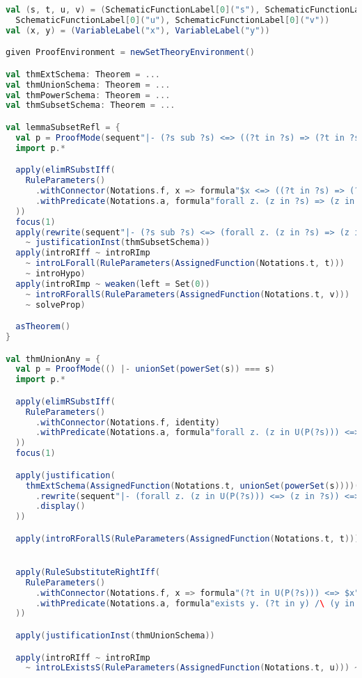 \begin{lstlisting}[language=Scala,basicstyle=\fontsize{2.5}{4}\selectfont]
val (s, t, u, v) = (SchematicFunctionLabel[0]("s"), SchematicFunctionLabel[0]("t"),
  SchematicFunctionLabel[0]("u"), SchematicFunctionLabel[0]("v"))
val (x, y) = (VariableLabel("x"), VariableLabel("y"))

given ProofEnvironment = newSetTheoryEnvironment()

val thmExtSchema: Theorem = ...
val thmUnionSchema: Theorem = ...
val thmPowerSchema: Theorem = ...
val thmSubsetSchema: Theorem = ...

val lemmaSubsetRefl = {
  val p = ProofMode(sequent"|- (?s sub ?s) <=> ((?t in ?s) => (?t in ?s))")
  import p.*

  apply(elimRSubstIff(
    RuleParameters()
      .withConnector(Notations.f, x => formula"$x <=> ((?t in ?s) => (?t in ?s))")
      .withPredicate(Notations.a, formula"forall z. (z in ?s) => (z in ?s)")
  ))
  focus(1)
  apply(rewrite(sequent"|- (?s sub ?s) <=> (forall z. (z in ?s) => (z in ?s))")
    ~ justificationInst(thmSubsetSchema))
  apply(introRIff ~ introRImp
    ~ introLForall(RuleParameters(AssignedFunction(Notations.t, t)))
    ~ introHypo)
  apply(introRImp ~ weaken(left = Set(0))
    ~ introRForallS(RuleParameters(AssignedFunction(Notations.t, v)))
    ~ solveProp)

  asTheorem()
}

val thmUnionAny = {
  val p = ProofMode(() |- unionSet(powerSet(s)) === s)
  import p.*

  apply(elimRSubstIff(
    RuleParameters()
      .withConnector(Notations.f, identity)
      .withPredicate(Notations.a, formula"forall z. (z in U(P(?s))) <=> (z in ?s)")
  ))
  focus(1)

  apply(justification(
    thmExtSchema(AssignedFunction(Notations.t, unionSet(powerSet(s))))(AssignedFunction(Notations.u, s))
      .rewrite(sequent"|- (forall z. (z in U(P(?s))) <=> (z in ?s)) <=> (U(P(?s)) = ?s)")
      .display()
  ))

  apply(introRForallS(RuleParameters(AssignedFunction(Notations.t, t))))


  apply(RuleSubstituteRightIff(
    RuleParameters()
      .withConnector(Notations.f, x => formula"(?t in U(P(?s))) <=> $x")
      .withPredicate(Notations.a, formula"exists y. (?t in y) /\ (y in P(?s))")
  ))

  apply(justificationInst(thmUnionSchema))

  apply(introRIff ~ introRImp
    ~ introLExistsS(RuleParameters(AssignedFunction(Notations.t, u))) ~ introLAnd)


\end{lstlisting}
